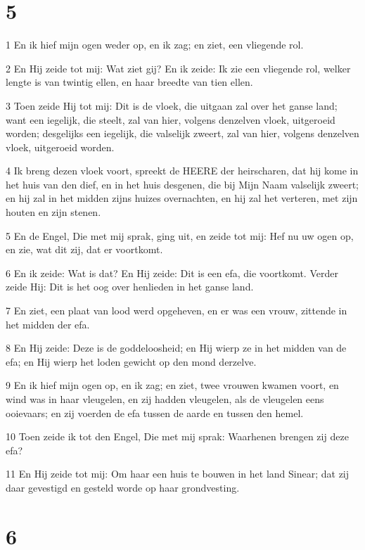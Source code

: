 \chapter{5}

\par 1 En ik hief mijn ogen weder op, en ik zag; en ziet, een vliegende rol.
\par 2 En Hij zeide tot mij: Wat ziet gij? En ik zeide: Ik zie een vliegende rol, welker lengte is van twintig ellen, en haar breedte van tien ellen.
\par 3 Toen zeide Hij tot mij: Dit is de vloek, die uitgaan zal over het ganse land; want een iegelijk, die steelt, zal van hier, volgens denzelven vloek, uitgeroeid worden; desgelijks een iegelijk, die valselijk zweert, zal van hier, volgens denzelven vloek, uitgeroeid worden.
\par 4 Ik breng dezen vloek voort, spreekt de HEERE der heirscharen, dat hij kome in het huis van den dief, en in het huis desgenen, die bij Mijn Naam valselijk zweert; en hij zal in het midden zijns huizes overnachten, en hij zal het verteren, met zijn houten en zijn stenen.
\par 5 En de Engel, Die met mij sprak, ging uit, en zeide tot mij: Hef nu uw ogen op, en zie, wat dit zij, dat er voortkomt.
\par 6 En ik zeide: Wat is dat? En Hij zeide: Dit is een efa, die voortkomt. Verder zeide Hij: Dit is het oog over henlieden in het ganse land.
\par 7 En ziet, een plaat van lood werd opgeheven, en er was een vrouw, zittende in het midden der efa.
\par 8 En Hij zeide: Deze is de goddeloosheid; en Hij wierp ze in het midden van de efa; en Hij wierp het loden gewicht op den mond derzelve.
\par 9 En ik hief mijn ogen op, en ik zag; en ziet, twee vrouwen kwamen voort, en wind was in haar vleugelen, en zij hadden vleugelen, als de vleugelen eens ooievaars; en zij voerden de efa tussen de aarde en tussen den hemel.
\par 10 Toen zeide ik tot den Engel, Die met mij sprak: Waarhenen brengen zij deze efa?
\par 11 En Hij zeide tot mij: Om haar een huis te bouwen in het land Sinear; dat zij daar gevestigd en gesteld worde op haar grondvesting.

\chapter{6}

